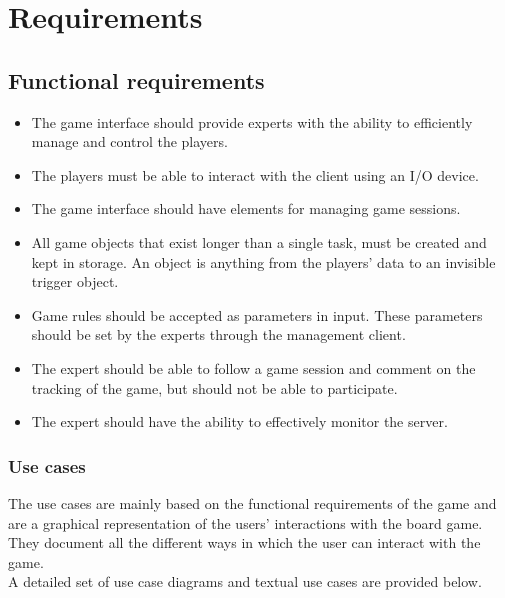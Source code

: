 \chapter{Requirements}
\section{Functional requirements}

\begin{itemize} \setlength{\itemsep}{0cm}\setlength{\parskip}{0cm}
	\item The game interface should provide experts with the ability to efficiently manage and control the players.
	\item The players must be able to interact with the client using an I/O device.
	\item The game interface should have elements for managing game sessions.
	\item All game objects that exist longer than a single task, must be created and kept in storage. An object is anything from the players’ data to an invisible trigger object.
	\item Game rules should be accepted as parameters in input. These parameters should be set by the experts through the management client. 
	\item The expert should be able to follow a game session and comment on the tracking of the game, but should not be able to participate.
	\item The expert should have the ability to effectively monitor the server.
\end{itemize}
\subsection{Use cases}
The use cases are mainly based on the functional requirements of the game and are a graphical representation of the users’ interactions with the board game. They document all the different ways in which the user can interact with the game. 
\\
A detailed set of use case diagrams and textual use cases are provided below.\\


